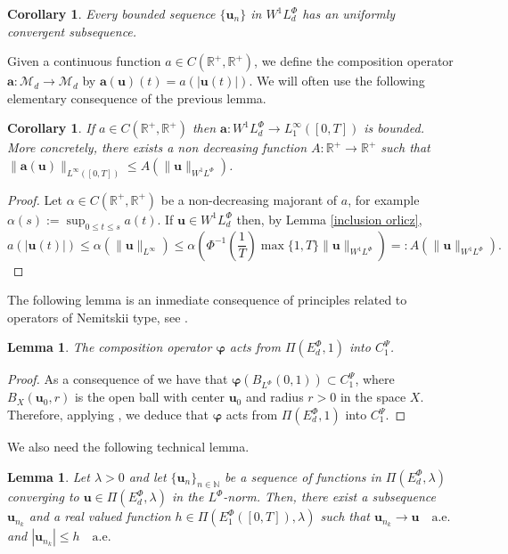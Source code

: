 \documentclass[twoside]{article}
\newtheorem{cor}[thm]{Corollary}
\newtheorem{lem}[thm]{Lemma}
\theoremstyle{remark}
\newcommand{\lphi}{L^{\Phi}}
\newcommand{\ephi}{E^{\Phi}}
\newcommand{\wphi}{W^{1}\lphi}
\renewcommand{\b}[1]{\boldsymbol{#1}}
\renewcommand{\leq}{\leqslant}
\begin{document}
 \begin{cor}\label{unif_conv} Every bounded sequence $\{\b{u}_n\}$ in  $\wphi_d$  has an uniformly convergent subsequence. 
\end{cor}



 Given a continuous function $a\in C(\mathbb{R}^+,\mathbb{R}^+)$, we define the composition operator $\b{a}:\mathcal{M}_d\to \mathcal{M}_d$ by $\b{a}(\b{u})(t)= a(|\b{u}(t)|)$.
We will often use the following elementary consequence of the previous lemma. 
\begin{cor}\label{a_bound} If $a\in C(\mathbb{R}^+,\mathbb{R}^+)$ then $\b{a}:\wphi_d\to L^{\infty}_1([0,T])$ is bounded. 
More concretely,  there exists a non decreasing function $A:\mathbb{R}^+\to\mathbb{R}^+$ such that
 $\|\b{a}(\b{u})\|_{L^{\infty}([0,T])}\leq A(\|\b{u}\|_{\wphi})$.
\end{cor}

\begin{proof}  Let $\alpha\in C(\mathbb{R}^+,\mathbb{R}^+)$ be a  non-decreasing majorant of $a$, for example 
$\alpha(s):=\sup_{0\leq t\leq s}a(t)$.  If $\b{u}\in \wphi_d$ then, by Lemma \ref{inclusion orlicz}, 
\[a(|\b{u}(t)|)\leq \alpha(\|\b{u}\|_{L^{\infty}})\leq 
\alpha\left(\Phi^{-1}\left(\frac{1}{T}\right)\max\{1,T\} \|\b{u}\|_{\wphi}\right)=: 
A(\|\b{u}\|_{\wphi}).\]
\end{proof}


The following lemma is an inmediate consequence of principles  related to  operators of Nemitskii type, see \cite[]{KR}.

\begin{lem}\label{phi_comp}   
The  composition operator  $\boldsymbol{\varphi}$  acts from $\Pi(\ephi_d,1)$ into $C_1^{\Psi}$.
\end{lem}
\begin{proof}
  As a consequence of \cite[Lemma 9.1]{KR} we have that  $\boldsymbol{\varphi}\left(B_{\lphi}(0,1)\right)\subset C_1^{\Psi}$, where
$B_{X}(\b{u}_0,r)$ is the open ball with center $\b{u}_0$ and radius $r>0$ in the space $X$. Therefore, applying \cite[Lemma 17.1]{KR}, we deduce that $\boldsymbol{\varphi}$ acts from $\Pi(\ephi_d,1)$ into $C_1^{\Psi}$.
\end{proof}

We also need the following technical lemma.
\begin{lem}\label{segundo lema}
Let $\lambda>0$ and let $\{\b{u}_n\}_{n\in \mathbb{N}}$ be a sequence of  functions in $\Pi(\ephi_d,\lambda)$ converging to  $\b{u}\in \Pi(\ephi_d,\lambda)$  in the $\lphi$-norm. Then, there exist a subsequence
$\b{u}_{n_k}$ and a real valued function $h\in\Pi\left(\ephi_1\left([0,T]\right),\lambda\right)$ such that $\b{u}_{n_k}\rightarrow \b{u} \quad\text{a.e.}$ and $|\b{u}_{n_k}|\leq h\quad\text{a.e.}$
\end{lem}
\end{document}
